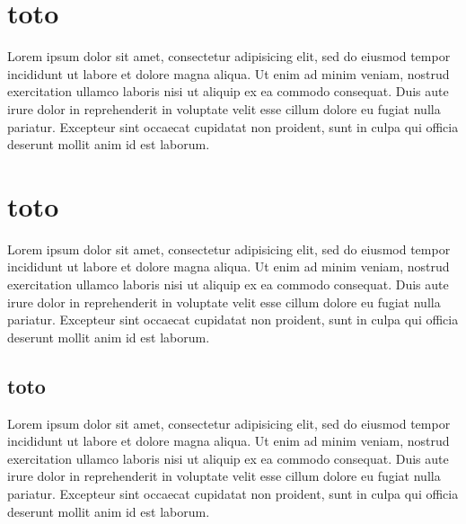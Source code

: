 \documentclass{article}
\begin{document}
\begin{pages}
\begin{Leftside}
\beginnumbering
\makeatletter
\def\@endledgrouphook{}
\makeatother
\pstart

\section{toto}\skipnumbering
\pend
\pstart
\begin{ledgroup}

Lorem ipsum dolor sit amet, consectetur adipisicing elit, sed do eiusmod tempor incididunt ut labore et dolore magna aliqua. Ut enim ad minim veniam, nostrud exercitation ullamco laboris nisi ut aliquip ex ea commodo consequat. Duis aute irure dolor in reprehenderit in voluptate velit esse cillum dolore eu fugiat nulla pariatur. Excepteur sint occaecat cupidatat non proident, sunt in culpa qui officia deserunt mollit anim id est laborum.
\end{ledgroup}
\pend

\pstart
\section{toto}
\pend
\pstart
\begin{ledgroup}

Lorem ipsum dolor sit amet, consectetur adipisicing elit, sed do eiusmod tempor incididunt ut labore et dolore magna aliqua. Ut enim ad minim veniam, nostrud exercitation ullamco laboris nisi ut aliquip ex ea commodo consequat. Duis aute irure dolor in reprehenderit in voluptate velit esse cillum dolore eu fugiat nulla pariatur. Excepteur sint occaecat cupidatat non proident, sunt in culpa qui officia deserunt mollit anim id est laborum.
\end{ledgroup}
\pend
\endnumbering
\end{Leftside}

\begin{Rightside}
\beginnumbering


\pstart
\section{toto}\skipnumbering
\pend
\pstart
\begin{ledgroup}

Lorem ipsum dolor sit amet, consectetur adipisicing elit, sed do eiusmod tempor incididunt ut labore et dolore magna aliqua. Ut enim ad minim veniam, nostrud exercitation ullamco laboris nisi ut aliquip ex ea commodo consequat. Duis aute irure dolor in reprehenderit in voluptate velit esse cillum dolore eu fugiat nulla pariatur. Excepteur sint occaecat cupidatat non proident, sunt in culpa qui officia deserunt mollit anim id est laborum.
\end{ledgroup}
\pend


\end{Rightside}
\end{pages}
\end{document}
